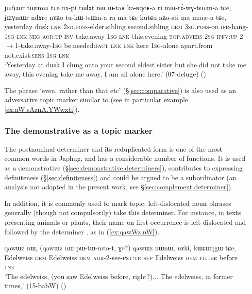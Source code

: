 \begin{exe}
\ex \label{ex:jWGmWr.ndAre}
\gll jɯfɕɯr tɯrmɯ tɕe nɤ-pi tɯlɤt nɯ ɯ-taʁ ko-ɴqoʁ-a ri mɯ-tɤ́-wɣ-tsɯm-a tɕe,
jɯɣmɯr ndɤre nɤʑo tu-kɯ-tsɯm-a ra ma tɕe kutɕu aʑo-sti ma maŋe-a tɕe, \\
 yesterday dusk \textsc{lnk} \textsc{2sg}.\textsc{poss}-elder.sibling  second.sibling \textsc{dem} \textsc{3sg}.\textsc{poss}-on \textsc{ifr}-hang-\textsc{1sg} \textsc{lnk} \textsc{neg}-\textsc{aor}:\textsc{up}-\textsc{inv}-take.away-\textsc{1sg} \textsc{lnk} this.evening \textsc{top}.\textsc{advers}  \textsc{2sg} \textsc{ipfv}:\textsc{up}-2$\rightarrow$1-take.away-\textsc{1sg} be.needed:\textsc{fact} \textsc{lnk} \textsc{lnk} here \textsc{1sg}-alone apart.from  not.exist:\textsc{sens}-\textsc{1sg} \textsc{lnk}  \\
\glt  `Yesterday at dusk I clung onto your second eldest sister but she did not take me away, this evening take me away, I am all alone here.' (07-deluge) ()
\end{exe}

The phrase  `even, rather than that etc' (§\ref{sec:comparative}) is also used as an adversative topic marker similar to  (see in particular example \ref{ex:nW.sAznA.YWwxti}).

\subsubsection{The demonstrative  as a topic marker} \label{sec:nW.topic}
The postnominal determiner  and its reduplicated form  is one of the most common words in Japhug, and has a considerable number of functions. It is used as a demonstrative (§\ref{sec:demonstrative.determiners}), contributes to expressing definiteness (§\ref{sec:definiteness}) and could be argued to be a subordinator (an analysis not adopted in the present work, see §\ref{sec:complement.determiner}).

In addition, it is commonly used to mark topic: left-dislocated noun phrases generally (though not compulsorily) take this determiner. For instance, in texts presenting animals or plants, their name on first occurrence is left dislocated and followed by the determiner , as in (\ref{ex:qawWz.nW}).

\begin{exe}
\ex \label{ex:qawWz.nW}
\gll  qawɯz nɯ, (qawɯz nɯ pɯ-tɯ-mto-t, ɣe?)  qawɯz nɯnɯ, nɤki, kɯɕɯŋgɯ tɕe, \\
Edelweiss \textsc{dem} Edelweiss \textsc{dem} \textsc{aor}-2-see-\textsc{pst}:\textsc{tr} \textsc{sfp} Edelweiss \textsc{dem} \textsc{filler} before \textsc{lnk} \\
\glt `The edelweiss, (you saw Edelweiss before, right?)... The edelweiss, in former times,' (15-babW) ()
\end{exe}

